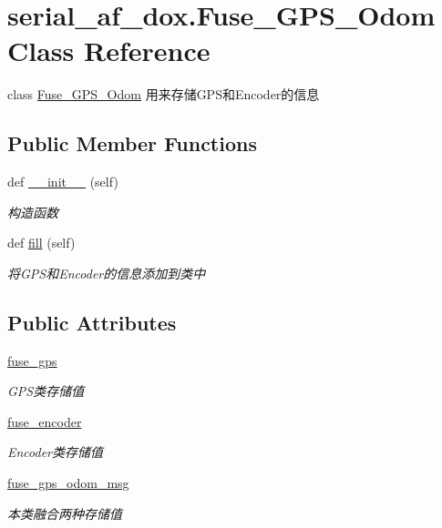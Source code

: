 \hypertarget{classserial__af__dox_1_1_fuse___g_p_s___odom}{}\section{serial\+\_\+af\+\_\+dox.\+Fuse\+\_\+\+G\+P\+S\+\_\+\+Odom Class Reference}
\label{classserial__af__dox_1_1_fuse___g_p_s___odom}


class \hyperlink{classserial__af__dox_1_1_fuse___g_p_s___odom}{Fuse\+\_\+\+G\+P\+S\+\_\+\+Odom} 用来存储\+G\+P\+S和\+Encoder的信息  


\subsection*{Public Member Functions}
\begin{DoxyCompactItemize}
\item 
def \hyperlink{classserial__af__dox_1_1_fuse___g_p_s___odom_a1a59120d460c21b446503b02e117e765}{\+\_\+\+\_\+init\+\_\+\+\_\+} (self)
\begin{DoxyCompactList}\small\item\em 构造函数 \end{DoxyCompactList}\item 
def \hyperlink{classserial__af__dox_1_1_fuse___g_p_s___odom_ac6e19e81cac92b7b9b4d1a14c5861ca0}{fill} (self)
\begin{DoxyCompactList}\small\item\em 将\+G\+P\+S和\+Encoder的信息添加到类中 \end{DoxyCompactList}\end{DoxyCompactItemize}
\subsection*{Public Attributes}
\begin{DoxyCompactItemize}
\item 
\hyperlink{classserial__af__dox_1_1_fuse___g_p_s___odom_af8b31f1a390bb7c639312a2a2cde72d5}{fuse\+\_\+gps}
\begin{DoxyCompactList}\small\item\em G\+P\+S类存储值 \end{DoxyCompactList}\item 
\hyperlink{classserial__af__dox_1_1_fuse___g_p_s___odom_a940d7d559ebfed6552fb4075c0311158}{fuse\+\_\+encoder}
\begin{DoxyCompactList}\small\item\em Encoder类存储值 \end{DoxyCompactList}\item 
\hyperlink{classserial__af__dox_1_1_fuse___g_p_s___odom_a90e3f11ddf0dc069e3faa18223e7a906}{fuse\+\_\+gps\+\_\+odom\+\_\+msg}
\begin{DoxyCompactList}\small\item\em 本类融合两种存储值 \end{DoxyCompactList}\end{DoxyCompactItemize}


